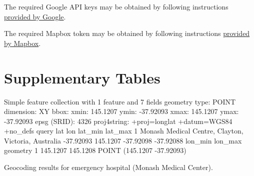 \documentclass[utf8]{frontiers_suppmat} %
\begin{document}
The required Google API keys may be obtained by following instructions
\href{https://developers.google.com/maps/documentation/embed/get-api-key}{provided
  by Google}.

The required Mapbox token may be obtained by following instructions
\href{https://www.mapbox.com/account/access-tokens}{provided by
  Mapbox}.

\section{Supplementary Tables}

\begin{table}[h]
\small
\begin{verbnobox}[\fontsize{8pt}{8pt}\selectfont]
Simple feature collection with 1 feature and 7 fields
geometry type:  POINT
dimension:      XY
bbox:           xmin: 145.1207 ymin: -37.92093 xmax: 145.1207 ymax: -37.92093
epsg (SRID):    4326
proj4string:    +proj=longlat +datum=WGS84 +no_defs
                                                query       lat      lon   lat_min   lat_max
1 Monash Medical Centre, Clayton, Victoria, Australia -37.92093 145.1207 -37.92098 -37.92088
   lon_min  lon_max                   geometry
1 145.1207 145.1208 POINT (145.1207 -37.92093)
\end{verbnobox}
\normalsize
\caption{Geocoding results for emergency hospital (Monash Medical Center).\label{tab:GeocodeMMC}}
\end{table}
\end{document}
